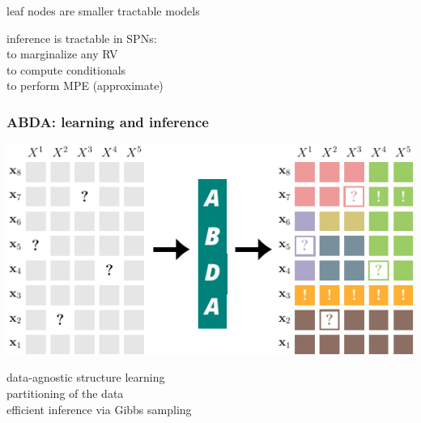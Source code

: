 \documentclass[xcolor={usenames,dvipsnames,svgnames}, compress, aspectratio=169, 11pt]{beamer}
\begin{document}
\begin{frame}[t, htt=bgrey2]
\begin{minipage}[t]{0.3\linewidth}
    leaf nodes are smaller tractable models
  \end{minipage}\hfill\begin{minipage}[t]{0.4\linewidth}
    \vspace{-150pt}
    inference is tractable in SPNs:\\
    to marginalize any RV\\
    to compute conditionals\\
    to perform MPE (approximate)\\
  \end{minipage}  
\end{frame}

\begin{frame}[t, htt=bgrey2]
  \frametitle{ABDA: learning and inference}

  \large
  \begin{minipage}[t]{0.6\linewidth}
    \includegraphics[width=.99\linewidth]{figures/abda-partitioning}
  \end{minipage}\hfill\begin{minipage}[t]{0.3\linewidth}
    \vspace{-150pt}
    data-agnostic structure learning\\

    partitioning of the data\\

    efficient inference via Gibbs sampling
    
  \end{minipage}  
\end{frame}
\end{document}
